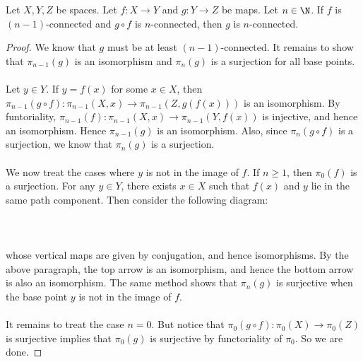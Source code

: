 \documentclass[a4paper]{article}
\begin{document}
\begin{lmm}{}{} Let $X,Y,Z$ be spaces. Let $f:X\to Y$ and $g:Y\to Z$ be maps. Let $n\in\N$. If $f$ is $(n-1)$-connected and $g\circ f$ is $n$-connected, then $g$ is $n$-connected. \tcbline
\begin{proof}
We know that $g$ must be at least $(n-1)$-connected. It remains to show that $\pi_{n-1}(g)$ is an isomorphism and $\pi_n(g)$ is a surjection for all base points. \\~\\

Let $y\in Y$. If $y=f(x)$ for some $x\in X$, then $\pi_{n-1}(g\circ f):\pi_{n-1}(X,x)\to\pi_{n-1}(Z,g(f(x)))$ is an isomorphism. By funtoriality, $\pi_{n-1}(f):\pi_{n-1}(X,x)\to\pi_{n-1}(Y,f(x))$ is injective, and hence an isomorphism. Hence $\pi_{n-1}(g)$ is an isomorphism. Also, since $\pi_n(g\circ f)$ is a surjection, we know that $\pi_n(g)$ is a surjection. \\~\\

We now treat the cases where $y$ is not in the image of $f$. If $n\geq 1$, then $\pi_0(f)$ is a surjection. For any $y\in Y$, there exists $x\in X$ such that $f(x)$ and $y$ lie in the same path component. Then consider the following diagram: \\~\\
\\~\\
whose vertical maps are given by conjugation, and hence isomorphisms. By the above paragraph, the top arrow is an isomorphism, and hence the bottom arrow is also an isomorphism. The same method shows that $\pi_n(g)$ is surjective when the base point $y$ is not in the image of $f$. \\~\\

It remains to treat the case $n=0$. But notice that $\pi_0(g\circ f):\pi_0(X)\to\pi_0(Z)$ is surjective implies that $\pi_0(g)$ is surjective by functoriality of $\pi_0$. So we are done. 
\end{proof}
\end{lmm}
\end{document}

